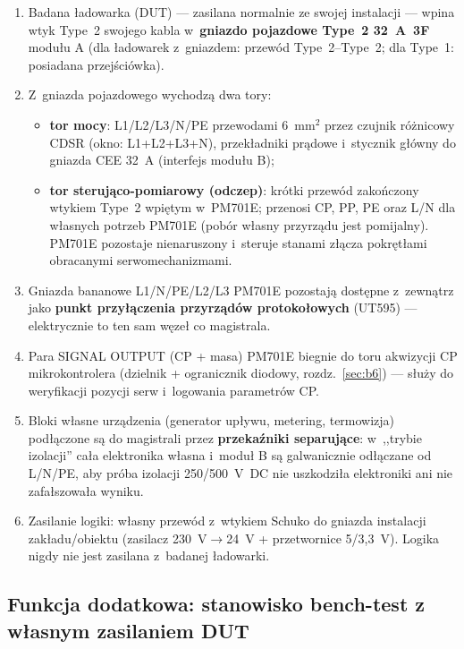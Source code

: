 \documentclass[11pt,a4paper]{article}
\begin{document}
\begin{enumerate}
\item Badana ładowarka (DUT) --- zasilana normalnie ze swojej instalacji --- wpina wtyk Type~2 swojego kabla w~\textbf{gniazdo pojazdowe Type~2 32~A~3F} modułu A (dla ładowarek z~gniazdem: przewód Type~2--Type~2; dla Type~1: posiadana przejściówka).
\item Z~gniazda pojazdowego wychodzą dwa tory:
  \begin{itemize}
  \item \textbf{tor mocy}: L1/L2/L3/N/PE przewodami 6~mm$^2$ przez czujnik różnicowy CDSR (okno: L1+L2+L3+N), przekładniki prądowe i~stycznik główny do gniazda CEE 32~A (interfejs modułu B);
  \item \textbf{tor sterująco-pomiarowy (odczep)}: krótki przewód zakończony wtykiem Type~2 wpiętym w~PM701E; przenosi CP, PP, PE oraz L/N dla własnych potrzeb PM701E (pobór własny przyrządu jest pomijalny). PM701E pozostaje nienaruszony i~steruje stanami złącza pokrętłami obracanymi serwomechanizmami.
  \end{itemize}
\item Gniazda bananowe L1/N/PE/L2/L3 PM701E pozostają dostępne z~zewnątrz jako \textbf{punkt przyłączenia przyrządów protokołowych} (UT595) --- elektrycznie to ten sam węzeł co magistrala.
\item Para SIGNAL OUTPUT (CP + masa) PM701E biegnie do toru akwizycji CP mikrokontrolera (dzielnik + ogranicznik diodowy, rozdz.~\ref{sec:b6}) --- służy do weryfikacji pozycji serw i~logowania parametrów CP.
\item Bloki własne urządzenia (generator upływu, metering, termowizja) podłączone są do magistrali przez \textbf{przekaźniki separujące}: w~,,trybie izolacji'' cała elektronika własna i~moduł B są galwanicznie odłączane od L/N/PE, aby próba izolacji 250/500~V~DC nie uszkodziła elektroniki ani nie zafałszowała wyniku.
\item Zasilanie logiki: własny przewód z~wtykiem Schuko do gniazda instalacji zakładu/obiektu (zasilacz 230~V$\rightarrow$24~V + przetwornice 5/3,3~V). Logika nigdy nie jest zasilana z~badanej ładowarki.
\end{enumerate}

\subsection{Funkcja dodatkowa: stanowisko bench-test z własnym zasilaniem DUT}
\label{sec:benchtest}
\end{document}
